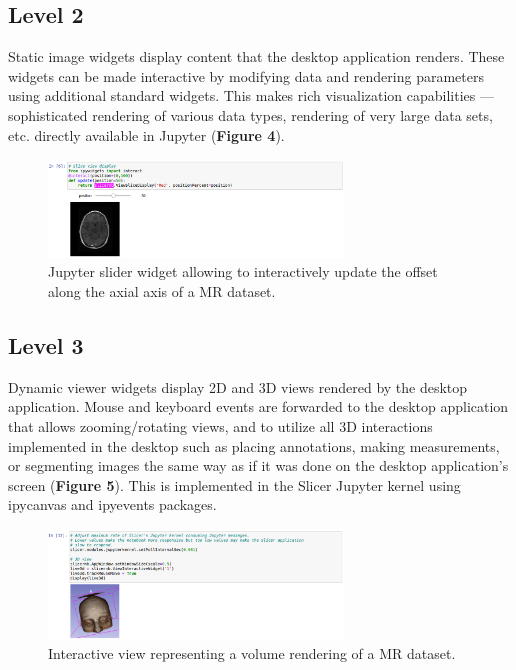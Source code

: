 \documentclass{IEEEcsmag}
\begin{document}
\subsection{Level 2}

Static image widgets display content that the desktop application renders. These widgets can be made interactive by modifying data and rendering parameters using additional standard widgets. This makes rich visualization capabilities — sophisticated rendering of various data types, rendering of very large data sets, etc. directly available in Jupyter ({\bf Figure 4}).

\begin{figure}
\centerline{\includegraphics[width=18.5pc]{figure4_slider_update.png}}
\caption{Jupyter slider widget allowing to interactively update the offset along the  axial axis of a MR dataset.}
\end{figure}

\subsection{Level 3}

Dynamic viewer widgets display 2D and 3D views rendered by the desktop application. Mouse and keyboard events are forwarded to the desktop application that allows zooming/rotating views, and to utilize all 3D interactions implemented in the desktop such as placing annotations, making measurements, or segmenting images the same way as if it was done on the desktop application’s screen ({\bf Figure 5}). This is implemented in the Slicer Jupyter kernel using ipycanvas and ipyevents packages.

\begin{figure}
\centerline{\includegraphics[width=18.5pc]{figure5_interactive_3d.png}}
\caption{Interactive view representing a volume rendering of a MR dataset.}
\end{figure}
\end{document}
